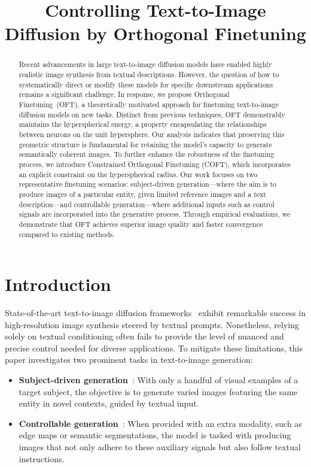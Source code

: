 \title{Controlling Text-to-Image Diffusion by Orthogonal Finetuning}

\begin{abstract}
Recent advancements in large text-to-image diffusion models have enabled highly realistic image synthesis from textual descriptions. However, the question of how to systematically direct or modify these models for specific downstream applications remains a significant challenge. In response, we propose Orthogonal Finetuning~(OFT), a theoretically motivated approach for finetuning text-to-image diffusion models on new tasks. Distinct from previous techniques, OFT demonstrably maintains the hyperspherical energy, a property encapsulating the relationships between neurons on the unit hypersphere. Our analysis indicates that preserving this geometric structure is fundamental for retaining the model's capacity to generate semantically coherent images. To further enhance the robustness of the finetuning process, we introduce Constrained Orthogonal Finetuning (COFT), which incorporates an explicit constraint on the hyperspherical radius. Our work focuses on two representative finetuning scenarios: subject-driven generation—where the aim is to produce images of a particular entity, given limited reference images and a text description—and controllable generation—where additional inputs such as control signals are incorporated into the generative process. Through empirical evaluations, we demonstrate that OFT achieves superior image quality and faster convergence compared to existing methods.
\end{abstract}

\section{Introduction}

State-of-the-art text-to-image diffusion frameworks~\cite{saharia2022photorealistic,ramesh2022hierarchical,rombach2022high} exhibit remarkable success in high-resolution image synthesis steered by textual prompts. Nonetheless, relying solely on textual conditioning often fails to provide the level of nuanced and precise control needed for diverse applications. To mitigate these limitations, this paper investigates two prominent tasks in text-to-image generation:

\begin{itemize}[leftmargin=*,nosep]

    \item \textbf{Subject-driven generation}~\cite{ruiz2023dreambooth}: With only a handful of visual examples of a target subject, the objective is to generate varied images featuring the same entity in novel contexts, guided by textual input.
    \item \textbf{Controllable generation}~\cite{zhang2023adding,mou2023t2i}: When provided with an extra modality, such as edge maps or semantic segmentations, the model is tasked with producing images that not only adhere to these auxiliary signals but also follow textual instructions.
\end{itemize}

